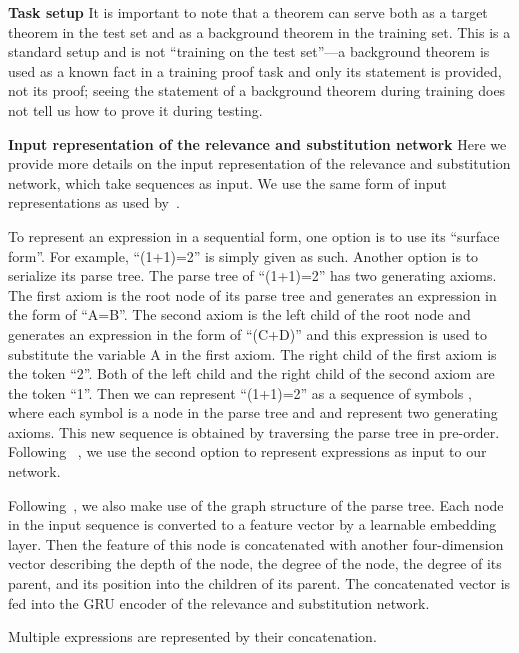 \documentclass{article}
\begin{document}
\noindent\textbf{Task setup}
It is important to note that a theorem can serve both as a target theorem in the test set and as a background theorem in the training set. This is a standard setup and is not ``training on the test set''---a background theorem is used as a known fact in a training proof task and only its statement is provided, not its proof; seeing the statement of a background theorem during training does not tell us how to prove it during testing. 

\noindent\textbf{Input representation of the relevance and substitution network}
Here we provide more details on the input representation of the relevance and substitution network, which take sequences as input. 
We use the same form of input representations 
 as used by~\citet{whalen2016holophrasm}.

To represent an expression in a sequential form, one option is to use its ``surface form''.  
For example, ``(1+1)=2'' is simply given as such. Another option is to serialize its parse tree. 
The parse tree of ``(1+1)=2'' has two generating axioms.
The first axiom is the root node of its parse tree and generates an expression in the form of ``A=B''.
The second axiom is the left child of the root node and generates 
an expression in the form of ``(C+D)'' and this expression is used to substitute the variable A in the first axiom.
The right child of the first axiom is the token ``2''.
Both of the left child and the right child of the second axiom are the token ``1''. 
Then we can represent ``(1+1)=2'' as a sequence of symbols
,
where each symbol is a node in the parse tree and  and  represent two generating axioms.
This new sequence is obtained by traversing the parse tree in pre-order. Following ~\citet{whalen2016holophrasm}, we use the second option to represent expressions as input to our network.

Following~\citet{whalen2016holophrasm},
we also make use of the graph structure of the parse tree.
Each node in the input sequence is converted 
to a feature vector by a learnable embedding layer. 
Then the feature of this node is concatenated with another four-dimension vector describing  
the depth of the node, the degree of the node, the degree of its parent, and its position into the children of its parent.
The concatenated vector is fed into the GRU encoder of the relevance and substitution network.

Multiple expressions are represented by 
their concatenation.
\end{document}

